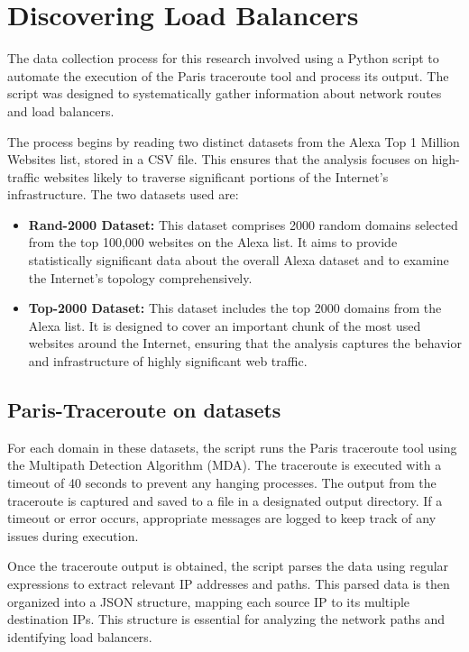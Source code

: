 \documentclass[12pt]{cwru_thesis}
\begin{document}
\section{Discovering Load Balancers}

The data collection process for this research involved using a Python script to automate the execution of the Paris traceroute tool and process its output. The script was designed to systematically gather information about network routes and load balancers.

The process begins by reading two distinct datasets from the Alexa Top 1 Million Websites list, stored in a CSV file. This ensures that the analysis focuses on high-traffic websites likely to traverse significant portions of the Internet's infrastructure. The two datasets used are:

\begin{itemize}
    \item \textbf{Rand-2000 Dataset:} This dataset comprises 2000 random domains selected from the top 100,000 websites on the Alexa list. It aims to provide statistically significant data about the overall Alexa dataset and to examine the Internet's topology comprehensively.
    \item \textbf{Top-2000 Dataset:} This dataset includes the top 2000 domains from the Alexa list. It is designed to cover an important chunk of the most used websites around the Internet, ensuring that the analysis captures the behavior and infrastructure of highly significant web traffic.
\end{itemize}



\subsection{Paris-Traceroute on datasets}

For each domain in these datasets, the script runs the Paris traceroute tool using the Multipath Detection Algorithm (MDA). The traceroute is executed with a timeout of 40 seconds to prevent any hanging processes. The output from the traceroute is captured and saved to a file in a designated output directory. If a timeout or error occurs, appropriate messages are logged to keep track of any issues during execution.

Once the traceroute output is obtained, the script parses the data using regular expressions to extract relevant IP addresses and paths. This parsed data is then organized into a JSON structure, mapping each source IP to its multiple destination IPs. This structure is essential for analyzing the network paths and identifying load balancers.
\end{document}
